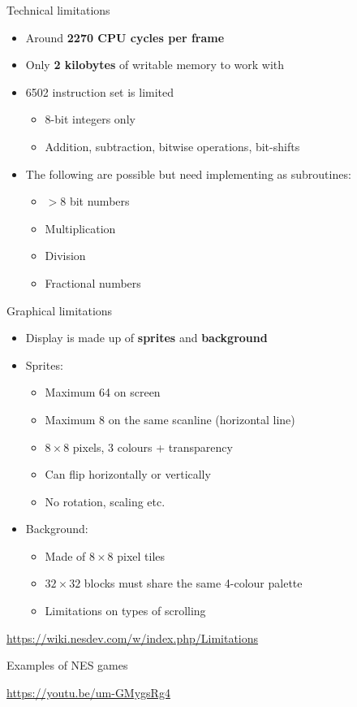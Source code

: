 \begin{frame}{Technical limitations}
	\begin{itemize}
		\pause\item Around \textbf{2270 CPU cycles per frame}
		\pause\item Only \textbf{2 kilobytes} of writable memory to work with
		\pause\item 6502 instruction set is limited
			\begin{itemize}
				\pause\item 8-bit integers only
				\pause\item Addition, subtraction, bitwise operations, bit-shifts
			\end{itemize}
		\pause\item The following are possible but need implementing as subroutines:
			\begin{itemize}
				\pause\item $>8$ bit numbers
				\pause\item Multiplication
				\pause\item Division
				\pause\item Fractional numbers
			\end{itemize}
	\end{itemize}
\end{frame}

\begin{frame}{Graphical limitations}
	\begin{itemize}
		\pause\item Display is made up of \textbf{sprites} and \textbf{background}
		\pause\item Sprites:
			\begin{itemize}
				\pause\item Maximum 64 on screen
				\pause\item Maximum 8 on the same scanline (horizontal line)
				\pause\item $8 \times 8$ pixels, 3 colours + transparency
				\pause\item Can flip horizontally or vertically
				\pause\item No rotation, scaling etc.
			\end{itemize}
		\pause\item Background:
			\begin{itemize}
				\pause\item Made of $8 \times 8$ pixel tiles
				\pause\item $32 \times 32$ blocks must share the same 4-colour palette
				\pause\item Limitations on types of scrolling
			\end{itemize}
	\end{itemize}
\end{frame}

\begin{frame}
	\begin{center}
		\url{https://wiki.nesdev.com/w/index.php/Limitations}
	\end{center}
\end{frame}

\begin{frame}{Examples of NES games}
	\begin{center}
		\url{https://youtu.be/um-GMygsRg4}
	\end{center}
\end{frame}
